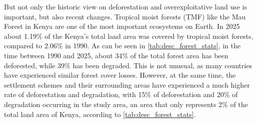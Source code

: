 \begin{customtable}
    \caption{Forest Cover Changes in Kenya's Tropical Moist Forest for different Subgroups since 1990}
    \label{tab:desc_forest_stats}
\end{customtable}

But not only the historic view on deforestation and overexploitative land use is important, but also recent changes.
Tropical moist forests (TMF) like the Mau Forest in Kenya are one of the most important ecosystems on Earth.
In 2025 about 1.19\% of the Kenya's total land area was covered by tropical moist forests, compared to 2.06\% in 1990.
As can be seen in \cref{tab:desc_forest_stats}, in the time between 1990 and 2025, about 34\% of the total forest area has been deforested, while 39\% has been degraded.
This is not unusual, as many countries have experienced similar forest cover losses.
However, at the same time, the settlement schemes and their surrounding areas have experienced a much higher rate of deforestation and degradation,
with 15\% of deforestation and 20\% of degradation occurring in the study area, an area that only represents 2\% of the total land area of Kenya, according to \cref{tab:desc_forest_stats}.